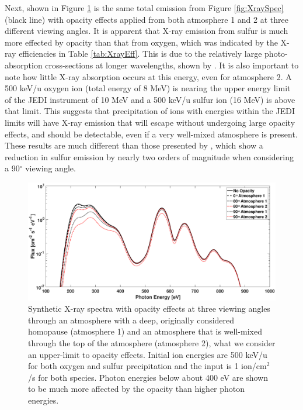 \documentclass[draft]{agujournal2018}
\begin{document}
Next, shown in Figure \ref{fig:XraySpecOpac} is the same total emission from Figure \ref{fig:XraySpec} (black line) with opacity effects applied from both atmosphere 1 and 2 at three different viewing angles.
It is apparent that X-ray emission from sulfur is much more effected by opacity than that from oxygen, which was indicated by the X-ray efficiencies in Table \ref{tab:XrayEff}.
This is due to the relatively large photo-absorption cross-sections at longer wavelengths, shown by \citet{cravens2006}.
It is also important to note how little X-ray absorption occurs at this energy, even for atmosphere 2.
A 500 keV/u oxygen ion (total energy of 8 MeV) is nearing the upper energy limit of the JEDI instrument of 10 MeV \citep{mauk2017ssr} and a 500 keV/u sulfur ion (16 MeV) is above that limit.
This suggests that precipitation of ions with energies within the JEDI limits will have X-ray emission that will escape without undergoing large opacity effects, and should be detectable, even if a very well-mixed atmosphere is present.
These results are much different than those presented by \citet{ozak2010}, which show a reduction in sulfur emission by nearly two orders of magnitude when considering a 90$^{\circ}$ viewing angle.

\begin{figure}[ht]
    \centering
    \includegraphics[width=\textwidth]{Figures/OpacityATM1ATM2.eps}
    \caption{Synthetic X-ray spectra with opacity effects at three viewing angles through an atmosphere with a deep, originally considered homopause (atmosphere 1) and an atmosphere that is well-mixed through the top of the atmosphere (atmosphere 2), what we consider an upper-limit to opacity effects. Initial ion energies are 500 keV/u for both oxygen and sulfur precipitation and the input is 1 ion/cm$^2$/s for both species. Photon energies below about 400 eV are shown to be much more affected by the opacity than higher photon energies.}
    \label{fig:XraySpecOpac}
\end{figure}
\end{document}
